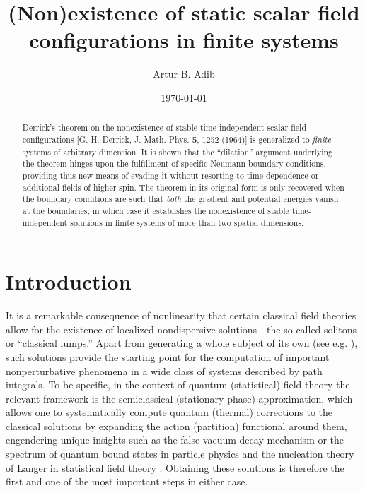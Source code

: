 \documentclass[a4paper,prd,twocolumn,showpacs,amsmath]{revtex4}
\begin{document}
\title{(Non)existence of static scalar field configurations in finite systems}

\author{Artur B. Adib}

\date{\today}

\begin{abstract}
Derrick's theorem on the nonexistence of stable time-independent scalar field configurations
[G. H. Derrick, J. Math. Phys. {\bf 5}, 1252 (1964)] is generalized to {\em finite} systems of
arbitrary dimension. It is shown that the ``dilation'' argument underlying the theorem
hinges upon the fulfillment of specific Neumann boundary conditions, providing
thus new means of evading it without resorting to time-dependence or additional fields of higher spin.
The theorem in its original form is only recovered when the boundary conditions are such that {\em both} the
gradient and potential energies vanish at the boundaries, in which case it establishes the nonexistence
of stable time-independent solutions in finite systems of more than two spatial dimensions.
\end{abstract}



\maketitle




\section{Introduction}
  \label{intro}

It is a remarkable consequence of nonlinearity that certain classical field theories allow for the existence
of localized nondispersive solutions - the so-called solitons or ``classical lumps.'' Apart from generating
a whole subject of its own (see e.g. \cite{dodd}), such solutions provide the starting point for the
computation of important nonperturbative phenomena in a wide class of systems described by path integrals.
To be specific, in the context of quantum (statistical) field theory the relevant framework is the
semiclassical (stationary phase) approximation, which allows one to systematically compute quantum
(thermal) corrections to the classical solutions by expanding the action (partition) functional
around them, engendering unique insights such as the false vacuum decay mechanism or the spectrum of
quantum bound states in particle physics \cite{rajaraman,coleman-book} and the nucleation theory
of Langer in statistical field theory \cite{schulman}. Obtaining these solutions is therefore
the first and one of the most important steps in either case.
\end{document}
